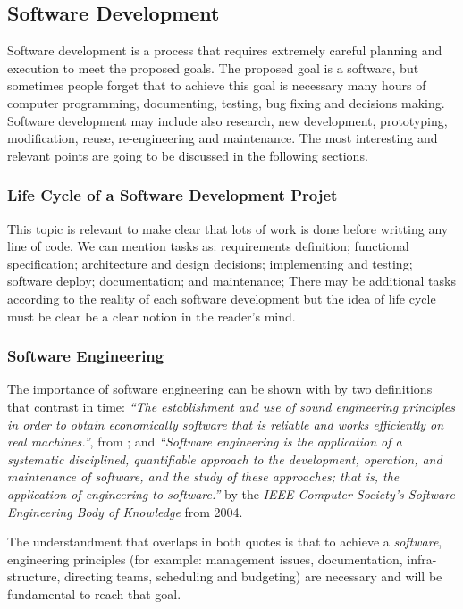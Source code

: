 \documentclass[ppgc,mestrado,english]{iiufrgs}
\begin{document}
\subsection{Software Development}
Software development is a process that requires extremely careful planning and execution to meet the proposed goals. The proposed goal is a software, but sometimes people forget that to achieve this goal is necessary many hours of computer programming, documenting, testing, bug fixing and decisions making. Software development may include also research, new development, prototyping, modification, reuse, re-engineering and maintenance. The most interesting and relevant points are going to be discussed in the following sections.
\subsubsection{Life Cycle of a Software Development Projet}
This topic is relevant to make clear that lots of work is done before writting any line of code. We can mention tasks as: requirements definition; functional specification; architecture and design decisions; implementing and testing; software deploy; documentation; and maintenance;
There may be additional tasks according to the reality of each software development but the idea of life cycle must be clear be a clear notion in the reader's mind. 

\subsubsection{Software Engineering}
The importance of software engineering can be shown with by two definitions that contrast in time: \emph{``The establishment and use of sound engineering principles in order to obtain economically software that is reliable and works efficiently on real machines.''}, from \cite{Bauer:68}; and \emph{``Software engineering is the application of a systematic disciplined, quantifiable approach to the development, operation, and maintenance of software, and the study of these approaches; that is, the application of engineering to software.''} by the \emph{IEEE Computer Society's Software Engineering Body of Knowledge} from 2004.

The understandment that overlaps in both quotes is that to achieve a \emph{software}, engineering principles (for example: management issues, documentation, infra-structure, directing teams, scheduling and budgeting) are necessary and will be fundamental to reach that goal.
\end{document}
